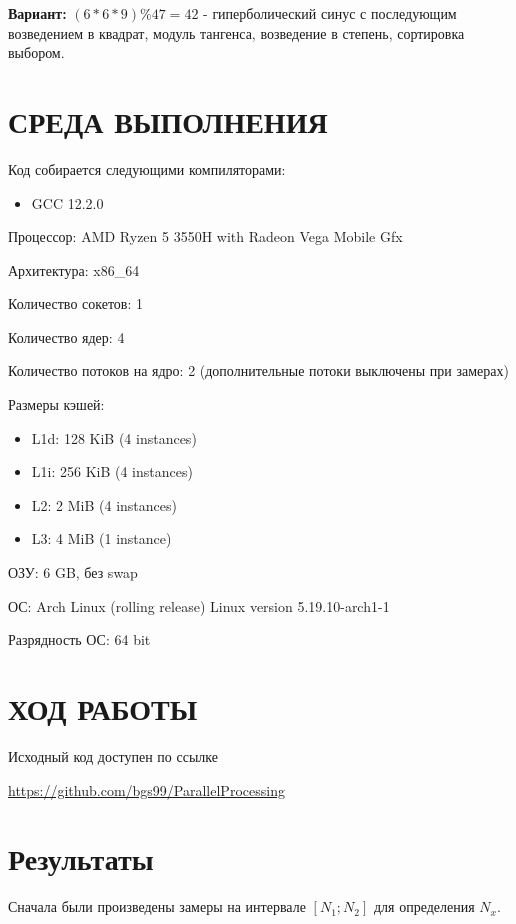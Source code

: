 \documentclass[14pt, a4paper, oneside, final]{extarticle}
\begin{document}
\textbf{Вариант:} $(6*6*9) \% 47 = 42$ - гиперболический синус с последующим возведением в квадрат, модуль тангенса, возведение в степень, сортировка выбором.

\clearpage
\section*{СРЕДА ВЫПОЛНЕНИЯ}

Код собирается следующими компиляторами:
\begin{itemize}
 \setlength{\itemindent}{3em}
 \item GCC 12.2.0
\end{itemize}

Процессор: AMD Ryzen 5 3550H with Radeon Vega Mobile Gfx

Архитектура: x86\_64

Количество сокетов: 1

Количество ядер: 4

Количество потоков на ядро: 2 (дополнительные потоки выключены при замерах)

Размеры кэшей:
\begin{itemize}
 \setlength{\itemindent}{3em}
 \item L1d: 128 KiB (4 instances)
 \item L1i: 256 KiB (4 instances)
 \item L2: 2 MiB (4 instances)
 \item L3: 4 MiB (1 instance)
\end{itemize}

ОЗУ: 6 GB, без swap

ОС: Arch Linux (rolling release) Linux version 5.19.10-arch1-1

Разрядность ОС: 64 bit


\clearpage
\section*{ХОД РАБОТЫ}
Исходный код доступен по ссылке

\url{https://github.com/bgs99/ParallelProcessing}

\clearpage

\section*{Результаты}

Сначала были произведены замеры на интервале $[N_1;N_2]$ для определения  $N_x$.
\end{document}
